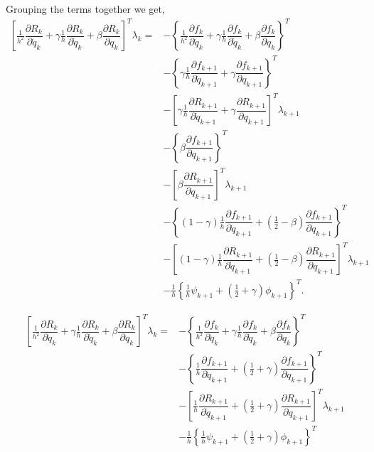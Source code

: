 \documentclass[10pt,letter]{book}
\newcommand{\pd}[2]{\dfrac{\partial #1}{\partial #2}}
\begin{document}
     Grouping the terms together we get,
     \begin{equation}
       \begin{split}
         \left[ \frac{1}{h^2} \pd{R_k}{\ddot{q}_k} + \gamma \frac{1}{h} \pd{R_k}{\dot{q}_k} + \beta \pd{R_k}{{q}_k} \right]^T \lambda_k = &- \left\{ \frac{1}{h^2}  \pd{f_k}{\ddot{q}_k} + \gamma \frac{1}{h} \pd{f_k}{\dot{q}_k} + \beta \pd{f_k}{{q}_k} \right\}^T \\
         & -  \left\{  \gamma \frac{1}{h}  \pd{f_{k+1}}{\dot{q}_{k+1}} +  \gamma \pd{f_{k+1}}{{q}_{k+1}} \right\}^T \\ 
         & -  \left[  \gamma \frac{1}{h}  \pd{R_{k+1}}{\dot{q}_{k+1}} + \gamma \pd{R_{k+1}}{{q}_{k+1}} \right]^T \lambda_{k+1}  \\
         & -  \left\{ \beta \pd{f_{k+1}}{{q}_{k+1}} \right\}^T \\ 
         & -  \left[  \beta\pd{R_{k+1}}{{q}_{k+1}} \right]^T \lambda_{k+1}  \\
         & -  \left\{ (1-\gamma) \frac{1}{h} \pd{f_{k+1}}{\dot{q}_{k+1}} + (\frac{1}{2}-\beta) \pd{f_{k+1}}{{q}_{k+1}} \right\}^T \\
         & -  \left[ (1-\gamma) \frac{1}{h} \pd{R_{k+1}}{\dot{q}_{k+1}} + (\frac{1}{2}-\beta) \pd{R_{k+1}}{{q}_{k+1}} \right]^T\lambda_{k+1} \\
         & -  \frac{1}{h} \left\{ \frac{1}{h} \psi_{k+1} + (\frac{1}{2} +\gamma) \phi_{k+1} \right\}^T.
       \end{split}
     \end{equation}
     
     \begin{equation}
       \begin{split}
         \left[ \frac{1}{h^2} \pd{R_k}{\ddot{q}_k} + \gamma \frac{1}{h} \pd{R_k}{\dot{q}_k} + \beta \pd{R_k}{{q}_k} \right]^T \lambda_k = &- \left\{ \frac{1}{h^2}  \pd{f_k}{\ddot{q}_k} + \gamma \frac{1}{h} \pd{f_k}{\dot{q}_k} + \beta \pd{f_k}{{q}_k} \right\}^T \\
         & -  \left\{  \frac{1}{h} \pd{f_{k+1}}{\dot{q}_{k+1}} +  (\frac{1}{2} +\gamma) \pd{f_{k+1}}{{q}_{k+1}} \right\}^T \\
         & -  \left[  \frac{1}{h} \pd{R_{k+1}}{\dot{q}_{k+1}} +  (\frac{1}{2} +\gamma)  \pd{R_{k+1}}{{q}_{k+1}} \right]^T\lambda_{k+1} \\
         & -  \frac{1}{h} \left\{ \frac{1}{h} \psi_{k+1} + (\frac{1}{2} +\gamma) \phi_{k+1} \right\}^T\\
       \end{split}
     \end{equation}
\end{document}

